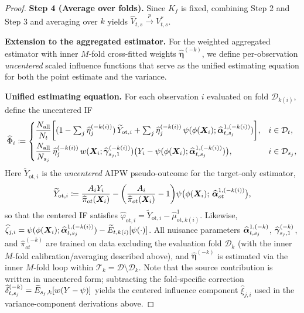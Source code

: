 \documentclass{article}
\begin{document}
\begin{proof}
\textbf{Step 4 (Average over folds).}
Since $K_f$ is fixed, combining Step 2 and Step 3 and averaging over $k$ yields $\widehat{V}_{t,s}\xrightarrow{p}V^*_{t,s}$.

\textbf{Extension to the aggregated estimator.}
For the weighted aggregated estimator with inner $M$-fold cross-fitted weights $\widehat{\boldsymbol{\eta}}^{(-k)}$, we define per-observation \emph{uncentered} scaled influence functions that serve as the unified estimating equation for both the point estimate and the variance.

\textbf{Unified estimating equation.}
For each observation $i$ evaluated on fold $\mathcal{D}_{k(i)}$, define the uncentered IF
\[
\widehat{\Phi}_i \coloneqq
\begin{cases}
\displaystyle\frac{N_{\mathrm{all}}}{N_t}\biggl[(1-\textstyle\sum_j \widehat{\eta}_j^{(-k(i))})\,\widetilde{Y}_{\mathrm{ot},i} + \textstyle\sum_j \widehat{\eta}_j^{(-k(i))}\,\psi(\phi(\boldsymbol{X}_i);\widehat{\boldsymbol{\alpha}}_{t,s_j}^{1,(-k(i))})\biggr], & i\in\mathcal{D}_t,\\[8pt]
\displaystyle\frac{N_{\mathrm{all}}}{N_{s_j}}\,\widehat{\eta}_j^{(-k(i))}\,w(\boldsymbol{X}_i;\widehat{\boldsymbol{\gamma}}_{s_j,1}^{(-k(i))})\bigl(Y_i - \psi(\phi(\boldsymbol{X}_i);\widehat{\boldsymbol{\alpha}}_{t,s_j}^{1,(-k(i))})\bigr), & i\in\mathcal{D}_{s_j},
\end{cases}
\]
Here $\widetilde{Y}_{\mathrm{ot},i}$ is the \emph{uncentered} AIPW pseudo-outcome for the target-only estimator,
\[
\widetilde{Y}_{\mathrm{ot},i}
  \coloneqq \frac{A_i Y_i}{\widehat{\pi}_{ot}(\boldsymbol{X}_i)}
  - \biggl(\frac{A_i}{\widehat{\pi}_{ot}(\boldsymbol{X}_i)} - 1\biggr)
    \psi\bigl(\phi(\boldsymbol{X}_i);\,\widehat{\boldsymbol{\alpha}}_{ot}^{1,(-k(i))}\bigr),
\]
so that the centered IF satisfies $\widehat{\varphi}_{\mathrm{ot},i} = \widetilde{Y}_{\mathrm{ot},i} - \widehat{\mu}^1_{\mathrm{ot},k(i)}$.
Likewise, $\widehat{\zeta}_{j,i} = \psi(\phi(\boldsymbol{X}_i);\widehat{\boldsymbol{\alpha}}_{t,s_j}^{1,(-k(i))}) - \widetilde{E}_{t,k(i)}[\psi(\cdot)]$.
All nuisance parameters $\widehat{\boldsymbol{\alpha}}_{t,s_j}^{1,(-k)}$, $\widehat{\boldsymbol{\gamma}}_{s_j,1}^{(-k)}$, and $\widehat{\pi}_{ot}^{(-k)}$ are trained on data excluding the evaluation fold $\mathcal{D}_k$ (with the inner $M$-fold calibration/averaging described above), and $\widehat{\boldsymbol{\eta}}^{(-k)}$ is estimated via the inner $M$-fold loop within $\mathcal{T}_k = \mathcal{D}\setminus\mathcal{D}_k$.
Note that the source contribution is written in uncentered form; subtracting the fold-specific correction $\widehat{\delta}_{t,s_j}^{(-k)} = \widetilde{E}_{s_j,k}[w(Y-\psi)]$ yields the centered influence component $\widehat{\xi}_{j,i}$ used in the variance-component derivations above.


\end{proof}
\end{document}
